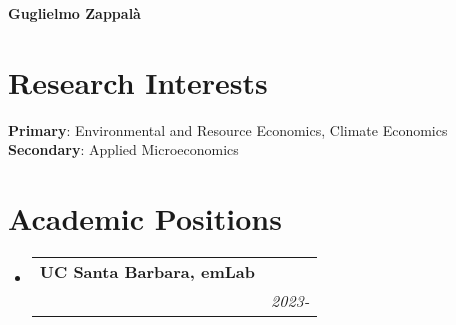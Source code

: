 \documentclass[letterpaper,11pt]{article}
\makeatletter
\newcommand{\resumeSubheading}[4]{
  \vspace{-2pt}\item
    \begin{tabular*}{0.97\textwidth}[t]{l@{\extracolsep{\fill}}r}
      \textbf{#1} & #2 \\
      \text{\small#3} & \textit{\small #4} \\
    \end{tabular*}\vspace{-7pt}
}
\newcommand{\resumeSubHeadingListStart}{\begin{itemize}[leftmargin=0.15in, label={}]}
\newcommand{\resumeSubHeadingListEnd}{\end{itemize}}
\makeatother
\begin{document}
\centering  \LARGE{\textbf{Guglielmo Zappalà}} \\
\normalsize
\medskip
    \small{

\section{Research Interests}
 \begin{itemize}[leftmargin=0.15in, label={}]
    \small{\item{
     \textbf{Primary}: Environmental and Resource Economics, Climate Economics \\
     \textbf{Secondary}: Applied Microeconomics
    }}
 \end{itemize}

 \section{Academic Positions}
   \resumeSubHeadingListStart
         \resumeSubheading
      {UC Santa Barbara,  emLab}{}
       {\text{Postdoctoral Researcher}}{2023-}  
   \resumeSubHeadingListEnd 
  
}
\end{document}
